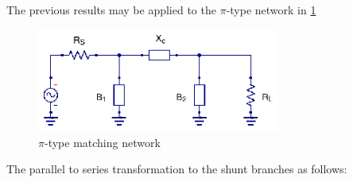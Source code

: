 \noindent The previous results may be applied to the $\pi$-type network in \ref{fig:pi-matching}

\begin{figure}[H]
\centering
\includegraphics[width=80mm]{pi-type-network}
\caption{$\pi$-type matching network}
\label{fig:pi-matching}
\end{figure}

\noindent The parallel to series transformation to the shunt branches as follows:

